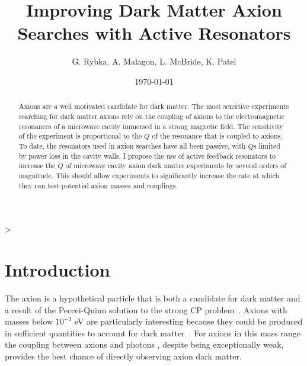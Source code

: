 >\documentclass[aps,prl,twocolumn,groupedaddress]{revtex4-1}
\begin{document}
\title{Improving Dark Matter Axion Searches with Active Resonators}
\author{G. Rybka, A. Malagon, L. McBride, K. Patel}
\date{}                                           %

%

\date{\today}

\begin{abstract}
Axions are a well motivated candidate for dark matter.  The most sensitive experiments searching for dark matter axions rely on the coupling of axions to the electromagnetic resonances of a microwave cavity immersed in a strong magnetic field.  The sensitivity of the experiment is proportional to the $Q$ of the resonance that is coupled to axions.
To date, the resonators used in axion searches have all been passive, with $Q$s limited by power loss in the cavity walls.  I propose the use of active feedback resonators to increase the $Q$ of microwave cavity axion dark matter experiments by several orders of magnitude.
This should allow experiments to significantly increase the rate at which they can test potential axion masses and couplings.
\end{abstract}

\pacs{}

\maketitle

\section{Introduction} 

The axion is a hypothetical particle that is both a candidate for dark matter and a result of the Peccei-Quinn solution to the strong CP problem~\cite{Peccei,Peccei_2,PhysRevLett.40.223,PhysRevLett.40.279,Preskill1983127,Abbott1983,ipser-sikivie}.
Axions with masses below $10^{-3}$ eV are particularly interesting because they could be produced in sufficient quantities to account for 
dark matter~\cite{Turner199067}.
For axions in this mass range the coupling between axions and photons
, despite being exceptionally weak, provides the best chance of directly observing axion dark matter.
\end{document}
